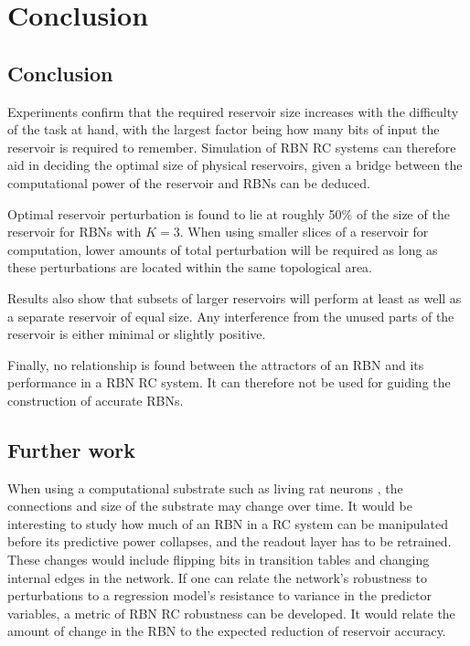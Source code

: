 \chapter{Conclusion}
\label{chapter:conclusion}

\section{Conclusion}

Experiments confirm that the required reservoir size increases with the difficulty of the task at hand,
with the largest factor being how many bits of input the reservoir is required to remember.
Simulation of RBN RC systems can therefore aid in deciding the optimal size of physical reservoirs,
given a bridge between the computational power of the reservoir and RBNs can be deduced.

Optimal reservoir perturbation is found to lie at roughly 50\% of the size of the reservoir for RBNs with $K=3$.
When using smaller slices of a reservoir for computation,
lower amounts of total perturbation will be required as long as these perturbations are located within the same topological area.

Results also show that subsets of larger reservoirs will perform at least as well as a separate reservoir of equal size.
Any interference from the unused parts of the reservoir is either minimal or slightly positive.

Finally, no relationship is found between the attractors of an RBN and its performance in a RBN RC system.
It can therefore not be used for guiding the construction of accurate RBNs.

\section{Further work}

When using a computational substrate such as living rat neurons \cite{demarse2005adaptive},
the connections and size of the substrate may change over time.
It would be interesting to study how much of an RBN in a RC system can be manipulated before its predictive power collapses,
and the readout layer has to be retrained.
These changes would include flipping bits in transition tables and changing internal edges in the network.
If one can relate the network's robustness to perturbations to a regression model's resistance to variance in the predictor variables,
a metric of RBN RC robustness can be developed.
It would relate the amount of change in the RBN to the expected reduction of reservoir accuracy.

